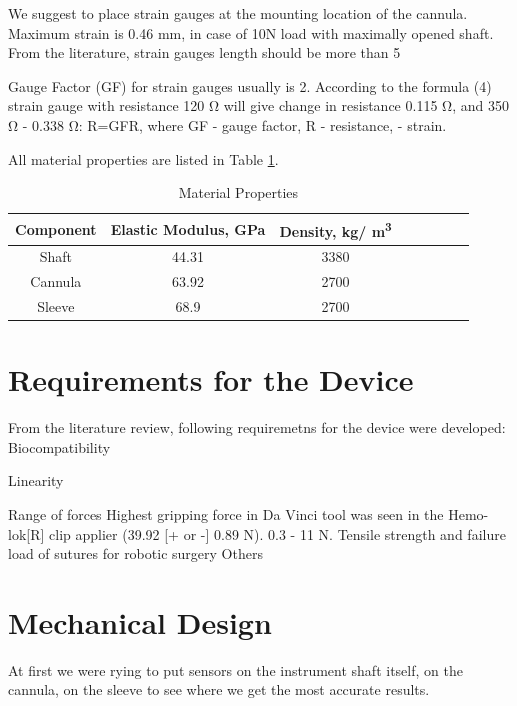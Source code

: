We suggest to place strain gauges at the mounting location of the cannula. Maximum strain is 0.46 mm, in case of 10N load with maximally opened shaft. From the literature, strain gauges length should be more than 5%

Gauge Factor (GF) for strain gauges usually is 2. According to the formula (4) strain gauge with resistance 120 Ω will give change in resistance 0.115 Ω, and 350 Ω - 0.338 Ω:
R=GFR,
where GF - gauge factor, R - resistance, - strain.

All material properties are listed in Table \ref{tab:matProp}.
\begin{table}
\caption {Material Properties} \label{tab:matProp} 
\begin{center}
\begin{tabular}{ | c | c | c | c | c | c | c | c | } 
\hline
Component & Elastic Modulus, GPa & Density, kg/ m\textsuperscript{3} \\ 
\hline
Shaft & 44.31 & 3380\\ 
\hline
Cannula & 63.92 & 2700 \\ 
\hline
Sleeve & 68.9 & 2700  \\ 
\hline
\end{tabular}
\end{center}
\end{table}

\section{Requirements for the Device}
	\label{sec:DevReq}
	From the literature review, following requiremetns for the device were developed:
	Biocompatibility
	
	Linearity
	
	Range of forces 
	Highest gripping force in Da Vinci tool was seen in the Hemo-lok[R] clip applier (39.92 [+ or -] 0.89 N).
	0.3 - 11 N. 
	Tensile strength and failure load of sutures for robotic surgery
	Others

\section{Mechanical Design}
\label{sec:mechDes}
At first we were rying to put sensors on the instrument shaft itself, on the cannula, on the sleeve to see where we get the most accurate results. 

